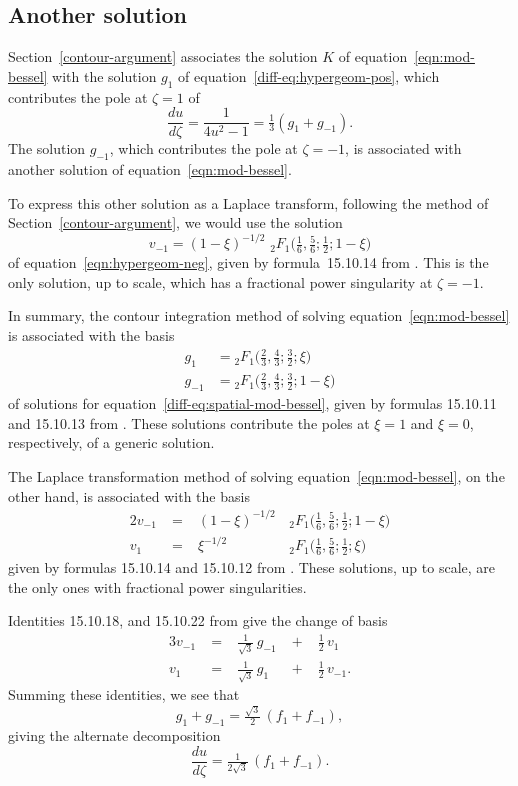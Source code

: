 \documentclass{article}
\theoremstyle{definition}
\begin{document}
\subsection{Another solution}
Section~\ref{contour-argument} associates the solution $K$ of equation~\eqref{eqn:mod-bessel} with the solution $g_1$ of equation~\eqref{diff-eq:hypergeom-pos}, which contributes the pole at $\zeta = 1$ of
\[ \frac{du}{d\zeta} = \frac{1}{4u^2 - 1} = \tfrac{1}{3}(g_1 + g_{-1}). \]
The solution $g_{-1}$, which contributes the pole at $\zeta = -1$, is associated with another solution of equation~\ref{eqn:mod-bessel}.

To express this other solution as a Laplace transform, following the method of Section~\ref{contour-argument}, we would use the solution
\[ v_{-1} = (1-\xi)^{-1/2} \,\, {}_2F_1\big(\tfrac{1}{6}, \tfrac{5}{6}; \tfrac{1}{2}; 1-\xi\big) \]
of equation~\ref{eqn:hypergeom-neg}, given by formula~15.10.14 from \cite{dlmf}. This is the only solution, up to scale, which has a fractional power singularity at $\zeta = -1$.

In summary, the contour integration method of solving equation~\eqref{eqn:mod-bessel} is associated with the basis
\begin{align*}
g_{1} & = {}_2F_1\big(\tfrac{2}{3}, \tfrac{4}{3}; \tfrac{3}{2}; \xi\big) \\
g_{-1} & = {}_2F_1\big(\tfrac{2}{3}, \tfrac{4}{3}; \tfrac{3}{2}; 1-\xi\big)
\end{align*}
of solutions for equation~\eqref{diff-eq:spatial-mod-bessel}, given by formulas 15.10.11 and 15.10.13 from \cite{dlmf}. These solutions contribute the poles at $\xi = 1$ and $\xi = 0$, respectively, of a generic solution.

The Laplace transformation method of solving equation~\eqref{eqn:mod-bessel}, on the other hand, is associated with the basis
\begin{alignat*}{2}
v_{-1} &\;=\;& (1-\xi)^{-1/2} & \, {}_2F_1\big(\tfrac{1}{6}, \tfrac{5}{6}; \tfrac{1}{2}; 1-\xi\big) \\
v_1 &\;=\:& \xi^{-1/2} & \, {}_2F_1\big(\tfrac{1}{6}, \tfrac{5}{6}; \tfrac{1}{2}; \xi\big)
\end{alignat*}
given by formulas 15.10.14 and 15.10.12 from \cite{dlmf}. These solutions, up to scale, are the only ones with fractional power singularities.

Identities 15.10.18, and 15.10.22 from \cite{dlmf} give the change of basis
\begin{alignat*}{3}
v_{-1} &\;=\;&\tfrac{1}{\sqrt{3}}\,g_{-1} &\;+\;& \tfrac{1}{2}\,v_1 \\
v_1 &\;=\;& \tfrac{1}{\sqrt{3}}\,g_{1} &\;+\;& \tfrac{1}{2}\,v_{-1}.
\end{alignat*}
Summing these identities, we see that
\[ g_1 + g_{-1} = \tfrac{\sqrt{3}}{2}\,(f_1 + f_{-1}), \]
giving the alternate decomposition
\[ \frac{du}{d\zeta} = \tfrac{1}{2\sqrt{3}}\,(f_1 + f_{-1}). \]
\end{document}
